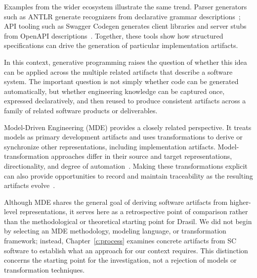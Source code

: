 Examples from the wider ecosystem illustrate the same trend. Parser generators
such as ANTLR generate recognizers from declarative grammar
descriptions~\citep{Parr1995}; API tooling such as Swagger Codegen generates
client libraries and server stubs from OpenAPI
descriptions~\citep{swagger2025}. Together, these tools show how structured
specifications can drive the generation of particular implementation
artifacts.

In this context, generative programming raises the question of whether this
idea can be applied across the multiple related artifacts that
describe a software system. The important question is not simply whether code
can be generated automatically, but whether engineering knowledge can be
captured once, expressed declaratively, and then reused to produce consistent
artifacts across a family of related software products or deliverables.

Model-Driven Engineering (MDE) provides a closely related perspective. It
treats models as primary development artifacts and uses transformations to
derive or synchronize other representations, including implementation
artifacts. Model-transformation approaches differ in their source and target
representations, directionality, and degree of automation~\citep{Czarnecki2003}.
Making these transformations explicit can also provide opportunities to record
and maintain traceability as the resulting artifacts
evolve~\citep{WinklerAndPilgrim2010}.

Although MDE shares the general goal of deriving software artifacts from
higher-level representations, it serves here as a retrospective point of
comparison rather than the methodological or theoretical starting point for
Drasil. We did not begin by selecting an MDE methodology, modeling language, or
transformation framework; instead, Chapter~\ref{c:process} examines concrete
artifacts from SC software to establish what an approach for our context
requires. This distinction concerns the starting point for the investigation,
not a rejection of models or transformation techniques.


